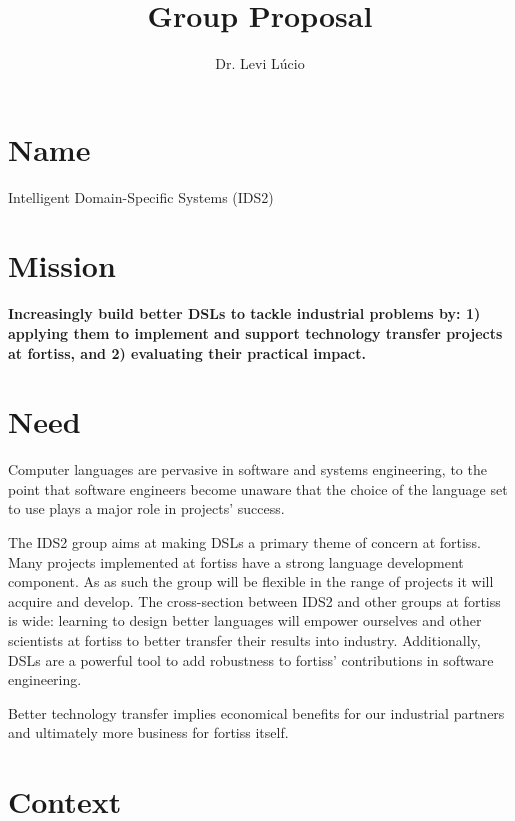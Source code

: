 \documentclass{article}
\begin{document}
\title{Group Proposal}

\author{Dr. Levi L\'ucio}

\maketitle


\section{Name}

Intelligent Domain-Specific Systems (IDS2)

\section{Mission}

\textbf{Increasingly build better DSLs to tackle industrial problems by:
1) applying them to implement and support technology transfer projects at
fortiss, and 2) evaluating their practical impact.}

\section{Need}

Computer languages are pervasive in software and systems engineering, to the
point that software engineers become unaware that the choice of the language set
to use plays a major role in projects' success. 

The IDS2 group aims at making DSLs a primary theme of concern at fortiss. Many
projects implemented at fortiss have a strong language development component. As
as such the group will be flexible in the range of projects it will acquire and
develop. The cross-section between IDS2 and other groups at fortiss is wide:
learning to design better languages will empower ourselves and other scientists
at fortiss to better transfer their results into industry. Additionally, DSLs
are a powerful tool to add robustness to fortiss' contributions in software
engineering.

Better technology transfer implies economical benefits for our industrial
partners and ultimately more business for fortiss itself.

\section{Context}
\end{document}

